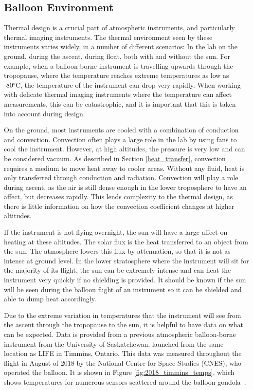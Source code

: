 \subsection{Balloon Environment} \label{balloon_env}
Thermal design is a crucial part of atmospheric instruments, and particularly thermal imaging instruments. The thermal environment seen by these instruments varies widely, in a number of different scenarios: In the lab on the ground, during the ascent, during float, both with and without the sun. For example, when a balloon-borne instrument is travelling upwards through the tropopause, where the temperature reaches extreme temperatures as low as -80°C, the temperature of the instrument can drop very rapidly. When working with delicate thermal imaging instruments where the temperature can affect measurements, this can be catastrophic, and it is important that this is taken into account during design.

On the ground, most instruments are cooled with a combination of conduction and convection. Convection often plays a large role in the lab by using fans to cool the instrument. However, at high altitudes, the pressure is very low and can be considered vacuum. As described in Section \ref{heat_transfer}, convection requires a medium to move heat away to cooler areas. Without any fluid, heat is only transferred through conduction and radiation. Convection will play a role during ascent, as the air is still dense enough in the lower troposphere to have an affect, but decreases rapidly. This lends complexity to the thermal design, as there is little information on how the convection coefficient changes at higher altitudes. 

If the instrument is not flying overnight, the sun will have a large affect on heating at these altitudes. The solar flux is the heat transferred to an object from the sun. The atmosphere lowers this flux by attenuation, so that it is not as intense at ground level. In the lower stratosphere where the instrument will sit for the majority of its flight, the sun can be extremely intense and can heat the instrument very quickly if no shielding is provided. It should be known if the sun will be seen during the balloon flight of an instrument so it can be shielded and able to dump heat accordingly.

Due to the extreme variation in temperatures that the instrument will see from the ascent through the tropopause to the sun, it is helpful to have data on what can be expected. Data is provided from a previous atmospheric balloon-borne instrument from the University of Saskatchewan, launched from the same location as LIFE in Timmins, Ontario. This data was measured throughout the flight in August of 2018 by the National Centre for Space Studies (CNES), who operated the balloon. It is shown in Figure \ref{fig:2018_timmins_temps}, which shows temperatures for numerous sensors scattered around the balloon gondola~\citep{CATS_report}.
 
